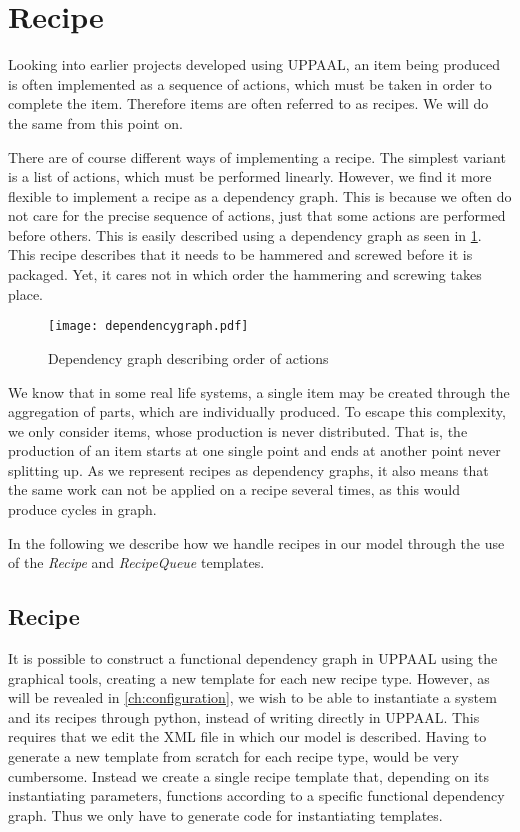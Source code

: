 \section{Recipe}\label{sec:recipe}
Looking into earlier projects developed using UPPAAL, an item being produced is often implemented as a sequence of actions, which must be taken in order to complete the item. Therefore items are often referred to as recipes. We will do the same from this point on. 

There are of course different ways of implementing a recipe. The simplest variant is a list of actions, which must be performed linearly. However, we find it more flexible to implement a recipe as a dependency graph. This is because we often do not care for the precise sequence of actions, just that some actions are performed before others. This is easily described using a dependency graph as seen in \cref{fig:dependency-graph}. This recipe describes that it needs to be hammered and screwed before it is packaged. Yet, it cares not in which order the hammering and screwing takes place. 

\begin{figure}[h]
\centering
\texttt{[image: dependencygraph.pdf]}
\caption{Dependency graph describing order of actions}
\label{fig:dependency-graph}
\end{figure}

We know that in some real life systems, a single item may be created through the aggregation of parts, which are individually produced. To escape this complexity, we only consider items, whose production is never distributed. That is, the production of an item starts at one single point and ends at another point never splitting up. As we represent recipes as dependency graphs, it also means that the same work can not be applied on a recipe several times, as this would produce cycles in graph. 

In the following we describe how we handle recipes in our model through the use of the \emph{Recipe} and \emph{RecipeQueue} templates.


\subsection{Recipe}\label{subs:recipe}
It is possible to construct a functional dependency graph in UPPAAL using the graphical tools,  creating a new template for each new recipe type. However, as will be revealed in \cref{ch:configuration}, we wish to be able to instantiate a system and its recipes through python, instead of writing directly in UPPAAL. This requires that we edit the XML file in which our model is described. Having to generate a new template from scratch for each recipe type, would be very cumbersome. Instead we create a single recipe template that, depending on its instantiating parameters, functions according to a specific functional dependency graph. Thus we only have to generate code for instantiating templates.

